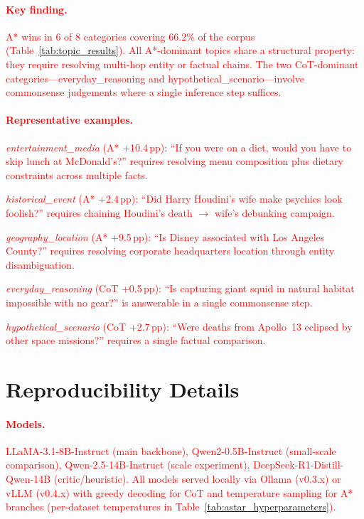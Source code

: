 \documentclass[11pt]{article}
\begin{document}
\textcolor{red}{\paragraph{Key finding.} A* wins in 6 of 8 categories covering 66.2\% of the corpus (Table~\ref{tab:topic_results}). All A*-dominant topics share a structural property: they require resolving multi-hop entity or factual chains. The two CoT-dominant categories---everyday\_reasoning and hypothetical\_scenario---involve commonsense judgements where a single inference step suffices.}

\textcolor{red}{\paragraph{Representative examples.}}
\textcolor{red}{\emph{entertainment\_media} (A* +10.4\,pp): ``If you were on a diet, would you have to skip lunch at McDonald's?'' requires resolving menu composition plus dietary constraints across multiple facts.}

\textcolor{red}{\emph{historical\_event} (A* +2.4\,pp): ``Did Harry Houdini's wife make psychics look foolish?'' requires chaining Houdini's death $\to$ wife's debunking campaign.}

\textcolor{red}{\emph{geography\_location} (A* +9.5\,pp): ``Is Disney associated with Los Angeles County?'' requires resolving corporate headquarters location through entity disambiguation.}

\textcolor{red}{\emph{everyday\_reasoning} (CoT +0.5\,pp): ``Is capturing giant squid in natural habitat impossible with no gear?'' is answerable in a single commonsense step.}

\textcolor{red}{\emph{hypothetical\_scenario} (CoT +2.7\,pp): ``Were deaths from Apollo~13 eclipsed by other space missions?'' requires a single factual comparison.}

\section{Reproducibility Details}
\label{app:reproducibility}

\textcolor{red}{\paragraph{Models.} LLaMA-3.1-8B-Instruct (main backbone), Qwen2-0.5B-Instruct (small-scale comparison), Qwen-2.5-14B-Instruct (scale experiment), DeepSeek-R1-Distill-Qwen-14B (critic/heuristic). All models served locally via Ollama (v0.3.x) or vLLM (v0.4.x) with greedy decoding for CoT and temperature sampling for A* branches (per-dataset temperatures in Table~\ref{tab:astar_hyperparameters}).}
\end{document}
